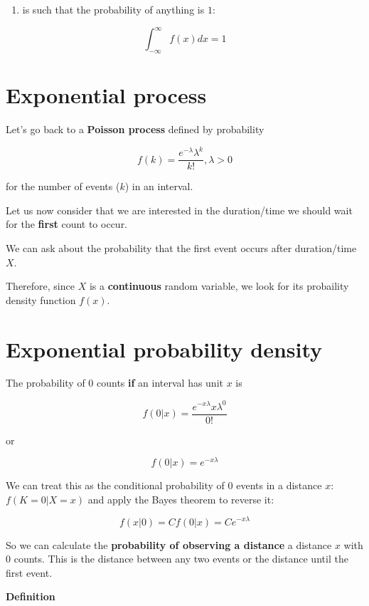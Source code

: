 \documentclass[
]{book}
\providecommand{\tightlist}{%
  \setlength{\itemsep}{0pt}\setlength{\parskip}{0pt}}
\begin{document}
\begin{enumerate}
\def\labelenumi{\arabic{enumi})}
\setcounter{enumi}{2}
\tightlist
\item
  is such that the probability of anything is \(1\):
\end{enumerate}

\[\int_{-\infty}^{\infty} f(x) dx = 1\]

\hypertarget{exponential-process}{%
\section{Exponential process}\label{exponential-process}}

Let's go back to a \textbf{Poisson process} defined by probability

\[f(k)=\frac{e^{-\lambda}\lambda^k}{k!}, \lambda>0\]

for the number of events (\(k\)) in an interval.

Let us now consider that we are interested in the duration/time we should wait for the \textbf{first} count to occur.

We can ask about the probability that the first event occurs after duration/time \(X\).

Therefore, since \(X\) is a \textbf{continuous} random variable, we look for its probaility density function \(f(x)\).

\hypertarget{exponential-probability-density}{%
\section{Exponential probability density}\label{exponential-probability-density}}

The probability of \(0\) counts \textbf{if} an interval has unit \(x\) is

\[f(0|x)=\frac{e^{-x\lambda}x\lambda^0}{0!}\]

or

\[f(0|x)=e^{-x\lambda}\]

We can treat this as the conditional probability of \(0\) events in a distance \(x\): \(f(K=0|X=x)\) and apply the Bayes theorem to reverse it:

\[f(x|0)=C f(0|x)=C e^{-x\lambda}\]

So we can calculate the \textbf{probability of observing a distance} a distance \(x\) with \(0\) counts. This is the distance between any two events or the distance until the first event.

\textbf{Definition}
\end{document}
